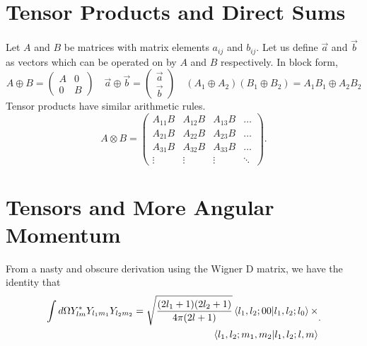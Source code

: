 \documentclass{article}
\begin{document}
    \section*{Tensor Products and Direct Sums}
    Let $A$ and  $B$ be matrices with matrix elements $a_{ij}$ and  $b_{ij}$.
    Let us define  $\vec a$ and  $ \vec b$ as vectors which can be operated on 
    by  $A$ and $B$ respectively. In block form, 
    \[
    A \oplus B = 
    \begin{pmatrix}
      A & 0 \\
      0 & B
    \end{pmatrix}
    \quad
    \vec{a} \oplus \vec{b} = 
    \begin{pmatrix}
      \vec a \\
      \vec b
    \end{pmatrix}
    \quad 
    (A_1 \oplus A_2)(B_1 \oplus B_2) = A_1 B_1 \oplus A_2 B_2
    \] 
    Tensor products have similar arithmetic rules. 
    \[
    A \otimes B = 
    \begin{pmatrix}
      A_{11} B  & A_{12}B & A_{13} B & \dots \\
      A_{21} B & A_{22} B & A_{23} B & \dots \\
      A_{31} B & A_{32} B & A_{33} B & \dots \\
      \vdots & \vdots  & \vdots  & \ddots
      
    \end{pmatrix}
    .\] 

  \section*{Tensors and More Angular Momentum}
    From a nasty and obscure derivation using the Wigner D matrix, 
    we have the identity that  \[
      \begin{split}
        \int d\Omega Y_{lm}^* Y_{l_1 m_1} Y_{l_2 m_2} = 
      \sqrt{\frac{(2l_1 +1)(2l_2 +1)}{4 \pi (2 l + 1)}} 
      \bra{l_1,l_2;00}\ket{l_1,l_2;l_0} \times \\
      \bra{l_1,l_2;m_1,m_2}\ket{l_1,l_2;l,m}
      \end{split}
    .\] 
   
\end{document}
